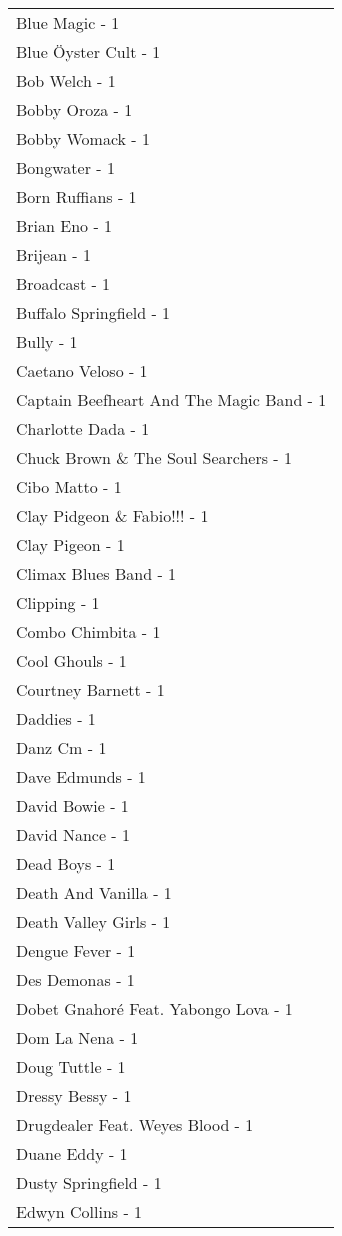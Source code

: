 \documentclass[
]{article}
\begin{document}
\begin{longtable}{l}
Blue Magic - 1 \\ 
Blue Öyster Cult - 1 \\ 
Bob Welch - 1 \\ 
Bobby Oroza - 1 \\ 
Bobby Womack - 1 \\ 
Bongwater - 1 \\ 
Born Ruffians - 1 \\ 
Brian Eno - 1 \\ 
Brijean - 1 \\ 
Broadcast - 1 \\ 
Buffalo Springfield - 1 \\ 
Bully - 1 \\ 
Caetano Veloso - 1 \\ 
Captain Beefheart And The Magic Band - 1 \\ 
Charlotte Dada - 1 \\ 
Chuck Brown \& The Soul Searchers - 1 \\ 
Cibo Matto - 1 \\ 
Clay Pidgeon \& Fabio!!! - 1 \\ 
Clay Pigeon - 1 \\ 
Climax Blues Band - 1 \\ 
Clipping - 1 \\ 
Combo Chimbita - 1 \\ 
Cool Ghouls - 1 \\ 
Courtney Barnett - 1 \\ 
Daddies - 1 \\ 
Danz Cm - 1 \\ 
Dave Edmunds - 1 \\ 
David Bowie - 1 \\ 
David Nance - 1 \\ 
Dead Boys - 1 \\ 
Death And Vanilla - 1 \\ 
Death Valley Girls - 1 \\ 
Dengue Fever - 1 \\ 
Des Demonas - 1 \\ 
Dobet Gnahoré Feat. Yabongo Lova - 1 \\ 
Dom La Nena - 1 \\ 
Doug Tuttle - 1 \\ 
Dressy Bessy - 1 \\ 
Drugdealer Feat. Weyes Blood - 1 \\ 
Duane Eddy - 1 \\ 
Dusty Springfield - 1 \\ 
Edwyn Collins - 1 \\ 

\end{longtable}
\end{document}
